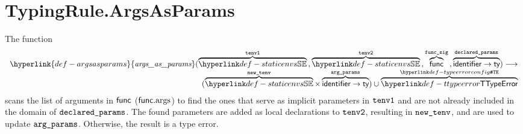 \documentclass{book}
\newcommand\ProseOtherwiseTypeError[0]{Otherwise, the result is a type error.}
\newcommand\argsasparams[0]{\hyperlink{def-argsasparams}{\textfunc{args\_as\_params}}}
\begin{document}
\section{TypingRule.ArgsAsParams \label{sec:TypingRule.ArgsAsParams}}
\hypertarget{def-argsasparams}{}
The function
\[
\begin{array}{r}
\argsasparams(
  \overname{\staticenvs}{\tenvone} \aslsep
  \overname{\staticenvs}{\tenvtwo} \aslsep
  \overname{\func}{\funcsig} \aslsep
  \overname{\identifier\rightarrow\ty}{\declaredparams}
  )
\aslto \\
(\overname{\staticenvs}{\newtenv} \times \overname{\identifier\rightarrow\ty}{\argparams})
\cup \overname{\TTypeError}{\TypeErrorConfig}
\end{array}
\]
scans the list of arguments in $\textsf{func}$ ($\textsf{func}.\text{args}$) to find the ones that serve as
implicit parameters in $\texttt{tenv1}$ and are not already included in the domain of $\texttt{declared\_params}$.
The found parameters are added as local declarations to $\texttt{tenv2}$, resulting in $\texttt{new\_tenv}$,
and are used to update $\texttt{arg\_params}$.
\ProseOtherwiseTypeError
\end{document}
